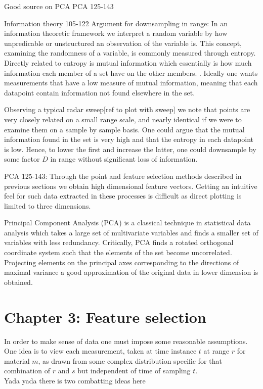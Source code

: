 \documentclass[a4paper, 12pt]{article}
\begin{document}
Good source on PCA
\cite{hyvasrinen_karhunen_oja_2004}
PCA 125-143

Information theory
105-122
Argument for downsampling in range: In an information theoretic framework we interpret a random variable by how unpredicable or unstructured an observation of the variable is. This concept, examining the randomness of a variable, is commonly measured through entropy. Directly related to entropy is mutual information which essentially is how much information each member of a set have on the other members. \cite{hyvasrinen_karhunen_oja_2004}. Ideally one wants measurements that have a low measure of mutual information, meaning that each datapoint contain information not found elsewhere in the set. 

Observing a typical radar sweep[ref to plot with sweep] we note that points are very closely related on a small range scale, and nearly identical if we were to examine them on a sample by sample basis. One could argue that the mutual information found in the set is very high and that the entropy in each datapoint is low. Hence, to lower the first and increase the latter, one could downsample by some factor $D$ in range without significant loss of information.


PCA 125-143: Through the point and feature selection methods described in previous sections we obtain high dimensional feature vectors. Getting an intuitive feel for such data extracted in these processes is difficult as direct plotting is limited to three dimensions. 

Principal Component Analysis (PCA) is  a classical technique in statistical data analysis which takes a large set of multivariate variables and finds a smaller set of variables with less redundancy. Critically, PCA finds a rotated orthogonal coordinate system such that the elements of the set become uncorrelated. Projecting elements on the principal axes corresponding to the directions of maximal variance a good approximation of the original data in lower dimension is obtained\citep{hyvasrinen_karhunen_oja_2004}. 

\section{Chapter 3: Feature selection}

In order to make sense of data one must impose some reasonable assumptions. 
\\ 
One idea is to view each measurement, taken at time instance $t$ at range $r$ for material $m$, as drawn from some 
complex distribution specific for that combination of $r$ and $s$ but independent of time of sampling $t$. 
\\
Yada yada there is two combatting ideas here
\end{document}
